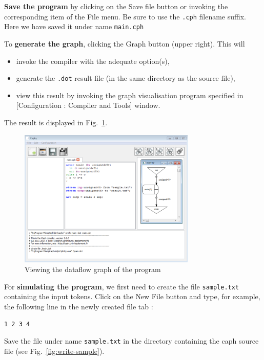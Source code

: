 \medskip
\textbf{Save the program} by clicking on the \textsf{Save file} button or invoking the corresponding item of
the \textsf{File} menu. Be sure to use the \verb|.cph| filename suffix. Here we have saved it under
name \verb|main.cph|

\medskip
To \textbf{generate the graph}, clicking the \textsf{Graph} button (upper right). This will
\begin{itemize}
\item invoke the \caph compiler with the adequate option(s),
\item generate the \texttt{.dot} result file (in the same directory as the source file),
\item view this result by invoking the graph visualisation program specified in 
  [\textsf{Configuration : Compiler and Tools}] window.
\end{itemize}

The result is displayed in Fig.~\ref{fig:make-dot}.

\begin{figure}[h]
  \centering
  \includegraphics[width=0.75\textwidth]{figs/ide/make-dot}
  \caption{Viewing the dataflow graph of the program}
  \label{fig:make-dot}
\end{figure}

\medskip
For \textbf{simulating the program}, we first need to create the file \texttt{sample.txt} containing
the input tokens. Click on the \textsf{New File} button and type, for example, the following line in
the newly created file tab :

\begin{verbatim}
1 2 3 4
\end{verbatim}

Save the file under name \texttt{sample.txt} in the directory containing the caph source file (see
Fig.~\ref{fig:write-sample}).

